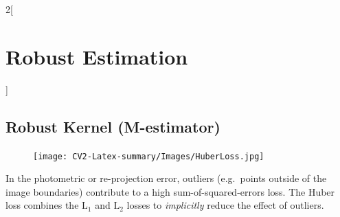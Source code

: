 \documentclass[oneside,fontsize=11pt,paper=a4]{scrartcl}
\begin{document}
\begin{multicols}{2}[\section{Robust Estimation}]
\subsection{Robust Kernel (M-estimator)}
\begin{figure}
    \texttt{[image: CV2-Latex-summary/Images/HuberLoss.jpg]}
\end{figure}
In the photometric or re-projection error, outliers (e.g.\ points outside of the image boundaries) contribute to a high sum-of-squared-errors loss. The Huber loss combines the $\text{L}_1$ and $\text{L}_2$ losses to \textit{implicitly} reduce the effect of outliers.

\end{multicols}
\newpage


\end{document}

